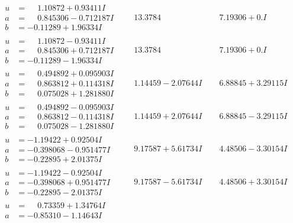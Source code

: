\documentclass[1p]{elsarticle_modified}
\theoremstyle{definition}
\begin{document}
$$\begin{array}{c|c|c}
\begin{aligned}
u &= \phantom{-}1.10872 + 0.93411 I \\
a &= \phantom{-}0.845306 - 0.712187 I \\
b &= -0.11289 + 1.96334 I\end{aligned}
 & \phantom{-}13.3784\phantom{ +0.000000I} & \phantom{-}7.19306 + 0. I\phantom{ +0.000000I} \\ \hline\begin{aligned}
u &= \phantom{-}1.10872 - 0.93411 I \\
a &= \phantom{-}0.845306 + 0.712187 I \\
b &= -0.11289 - 1.96334 I\end{aligned}
 & \phantom{-}13.3784\phantom{ +0.000000I} & \phantom{-}7.19306 + 0. I\phantom{ +0.000000I} \\ \hline\begin{aligned}
u &= \phantom{-}0.494892 + 0.095903 I \\
a &= \phantom{-}0.863812 + 0.114318 I \\
b &= \phantom{-}0.075028 + 1.281880 I\end{aligned}
 & \phantom{-}1.14459 - 2.07644 I & \phantom{-}6.88845 + 3.29115 I \\ \hline\begin{aligned}
u &= \phantom{-}0.494892 - 0.095903 I \\
a &= \phantom{-}0.863812 - 0.114318 I \\
b &= \phantom{-}0.075028 - 1.281880 I\end{aligned}
 & \phantom{-}1.14459 + 2.07644 I & \phantom{-}6.88845 - 3.29115 I \\ \hline\begin{aligned}
u &= -1.19422 + 0.92504 I \\
a &= -0.398068 - 0.951477 I \\
b &= -0.22895 + 2.01375 I\end{aligned}
 & \phantom{-}9.17587 + 5.61734 I & \phantom{-}4.48506 - 3.30154 I \\ \hline\begin{aligned}
u &= -1.19422 - 0.92504 I \\
a &= -0.398068 + 0.951477 I \\
b &= -0.22895 - 2.01375 I\end{aligned}
 & \phantom{-}9.17587 - 5.61734 I & \phantom{-}4.48506 + 3.30154 I \\ \hline\begin{aligned}
u &= \phantom{-}0.73359 + 1.34764 I \\
a &= -0.85310 - 1.14643 I \\

\end{aligned}
\end{array}$$
\end{document}
